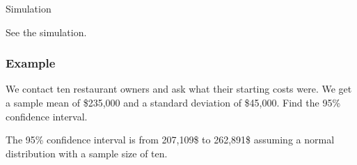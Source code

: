 \begin{frame}{Simulation}

  See the simulation.
  
\end{frame}


\begin{frame}
  \frametitle{Example}

  We contact ten restaurant owners and ask what their starting costs
  were. We get a sample mean of \$235,000 and a standard deviation of
  \$45,000. Find the 95\% confidence interval.

  \vfill

  {

    The 95\% confidence interval is from 207,109\$ to 262,891\$
    assuming a normal distribution with a sample size of ten.

  }

  \vfill

\end{frame}


